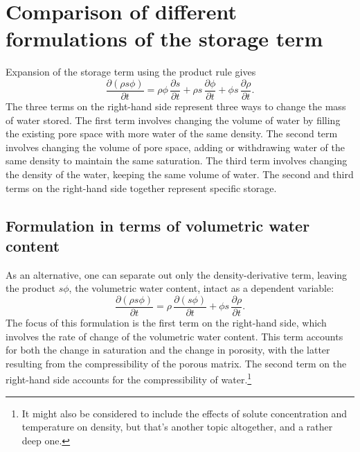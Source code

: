 \documentclass[fleqn]{article}
\begin{document}
{\color{purple}
\section{Comparison of different formulations of the storage term}

Expansion of the storage term using the product rule gives
\begin{equation}
\frac{\partial (\rho s \phi)}{\partial t}
  = \rho \phi\, \frac{\partial s}{\partial t}
  + \rho s\, \frac{\partial \phi}{\partial t}
  + \phi s\, \frac{\partial \rho}{\partial t} .
\label{eq-sto-expanded}
\end{equation}
The three terms on the right-hand side represent three ways to change the mass of water stored. The first term involves changing the volume of water by filling the existing pore space with more water of the same density. The second term involves changing the volume of pore space, adding or withdrawing water of the same density to maintain the same saturation. The third term involves changing the density of the water, keeping the same volume of water. The second and third terms on the right-hand side together represent specific storage.

\subsection{Formulation in terms of volumetric water content}

As an alternative, one can separate out only the density-derivative term, leaving the product $s \phi$, the volumetric water content, intact as a dependent variable:
\begin{equation}
\frac{\partial (\rho s \phi)}{\partial t}
  = \rho\,\frac{\partial (s\phi)}{\partial t}
  + \phi s\, \frac{\partial \rho}{\partial t} .
\label{eq-sto-expanded-rho}
\end{equation}
The focus of this formulation is the first term on the right-hand side, which involves the rate of change of the volumetric water content. This term accounts for both the change in saturation and the change in porosity, with the latter resulting from the compressibility of the porous matrix. The second term on the right-hand side accounts for the compressibility of water.\footnote{{\color{purple}It might also be considered to include the effects of solute concentration and temperature on density, but that's another topic altogether, and a rather deep one.}}

}
\end{document}
